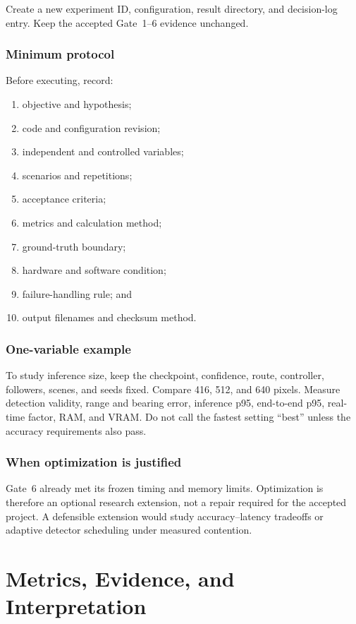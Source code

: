 \documentclass[11pt,oneside,openany]{book}
\begin{document}
Create a new experiment ID, configuration, result directory, and decision-log entry. Keep the accepted Gate~1--6 evidence unchanged.

\section{Minimum protocol}

Before executing, record:
\begin{enumerate}
  \item objective and hypothesis;
  \item code and configuration revision;
  \item independent and controlled variables;
  \item scenarios and repetitions;
  \item acceptance criteria;
  \item metrics and calculation method;
  \item ground-truth boundary;
  \item hardware and software condition;
  \item failure-handling rule; and
  \item output filenames and checksum method.
\end{enumerate}

\section{One-variable example}

To study inference size, keep the checkpoint, confidence, route, controller, followers, scenes, and seeds fixed. Compare 416, 512, and 640 pixels. Measure detection validity, range and bearing error, inference p95, end-to-end p95, real-time factor, RAM, and VRAM. Do not call the fastest setting ``best'' unless the accuracy requirements also pass.

\section{When optimization is justified}

Gate~6 already met its frozen timing and memory limits. Optimization is therefore an optional research extension, not a repair required for the accepted project. A defensible extension would study accuracy--latency tradeoffs or adaptive detector scheduling under measured contention.

\part{Metrics, Evidence, and Interpretation}
\end{document}
